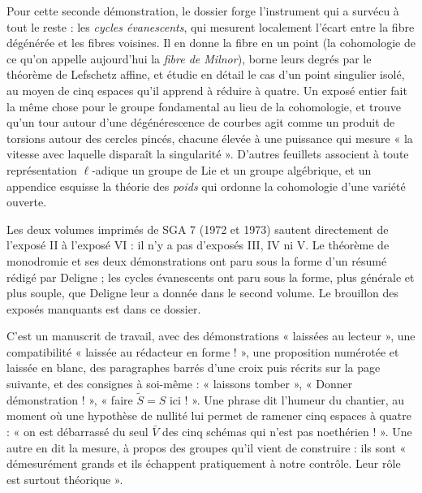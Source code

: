 \documentclass[11pt,a4paper]{article}
\begin{document}
\begin{resume}
Pour cette seconde démonstration, le dossier forge l'instrument qui a survécu à
tout le reste : les \emph{cycles évanescents}, qui mesurent localement l'écart
entre la fibre dégénérée et les fibres voisines. Il en donne la fibre en un
point (la cohomologie de ce qu'on appelle aujourd'hui la \emph{fibre de
Milnor}), borne leurs degrés par le théorème de Lefschetz affine, et étudie
en détail le cas d'un point singulier isolé, au moyen de cinq espaces qu'il
apprend à réduire à quatre. Un exposé entier fait la même chose pour le groupe
fondamental au lieu de la cohomologie, et trouve qu'un tour autour d'une
dégénérescence de courbes agit comme un produit de torsions autour des cercles
pincés, chacune élevée à une puissance qui mesure « la vitesse avec laquelle
disparaît la singularité ». D'autres feuillets associent à toute représentation
$\ell$-adique un groupe de Lie et un groupe algébrique, et un appendice esquisse
la théorie des \emph{poids} qui ordonne la cohomologie d'une variété ouverte.

Les deux volumes imprimés de SGA 7 (1972 et 1973)
sautent directement de l'exposé II à l'exposé VI : il n'y a pas d'exposés III,
IV ni V. Le théorème de monodromie et ses deux démonstrations ont paru sous la
forme d'un résumé rédigé par Deligne ; les cycles évanescents ont paru sous la
forme, plus générale et plus souple, que Deligne leur a donnée dans le second
volume. Le brouillon des exposés manquants est dans ce dossier.

C'est un manuscrit de travail, avec des démonstrations
« laissées au lecteur », une compatibilité « laissée au rédacteur en forme ! »,
une proposition numérotée et laissée en blanc, des paragraphes barrés d'une
croix puis récrits sur la page suivante, et des consignes à soi-même :
« laissons tomber », « Donner démonstration ! », « faire $\widetilde S = S$
ici ! ». Une phrase dit l'humeur du chantier, au moment où une hypothèse de
nullité lui permet de ramener cinq espaces à quatre : « on est débarrassé du
seul $\bar V$ des cinq schémas qui n'est pas noethérien ! ». Une autre en dit la mesure, à propos des groupes
qu'il vient de construire : ils sont « démesurément grands et ils échappent
pratiquement à notre contrôle. Leur rôle est surtout théorique ».


\end{resume}
\end{document}

